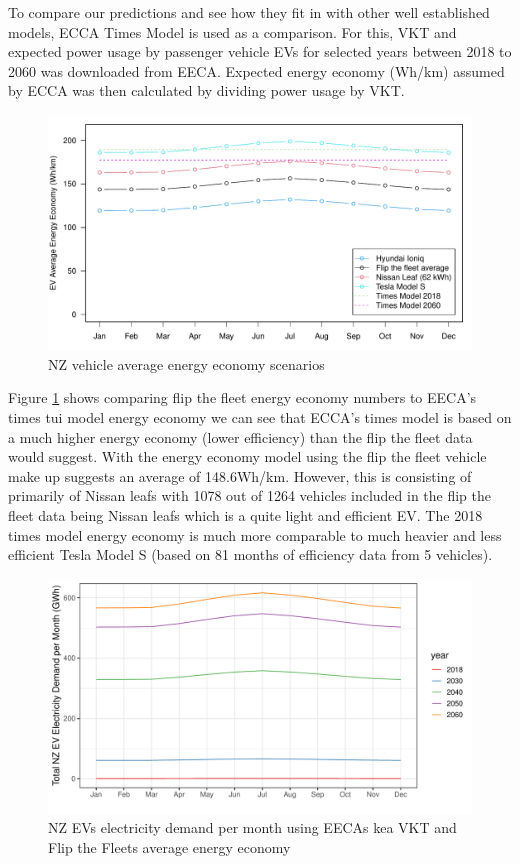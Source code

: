 \documentclass[
]{article}
\begin{document}
To compare our predictions and see how they fit in with other well
established models, ECCA Times Model \cite{times_model} is used as a
comparison. For this, VKT and expected power usage by passenger vehicle
EVs for selected years between 2018 to 2060 was downloaded from EECA.
Expected energy economy (Wh/km) assumed by ECCA was then calculated by
dividing power usage by VKT.

\begin{figure}
\centering
\includegraphics{final_report_files/figure-latex/vehicle_consum-1.pdf}
\caption{NZ vehicle average energy economy
scenarios\label{fig:vehicle_consum}}
\end{figure}

Figure \ref{fig:vehicle_consum} shows comparing flip the fleet energy
economy numbers to EECA's times tui model \cite{times_model} energy
economy we can see that ECCA's times model is based on a much higher
energy economy (lower efficiency) than the flip the fleet data would
suggest. With the energy economy model using the flip the fleet vehicle
make up suggests an average of 148.6Wh/km. However, this is consisting
of primarily of Nissan leafs with 1078 out of 1264 vehicles included in
the flip the fleet data being Nissan leafs which is a quite light and
efficient EV. The 2018 times model energy economy is much more
comparable to much heavier and less efficient Tesla Model S (based on 81
months of efficiency data from 5 vehicles).

\begin{figure}
\centering
\includegraphics{final_report_files/figure-latex/kea_power_usage-1.pdf}
\caption{NZ EVs electricity demand per month using EECAs kea VKT and
Flip the Fleets average energy economy\label{fig:kea_power_usage}}
\end{figure}
\end{document}
